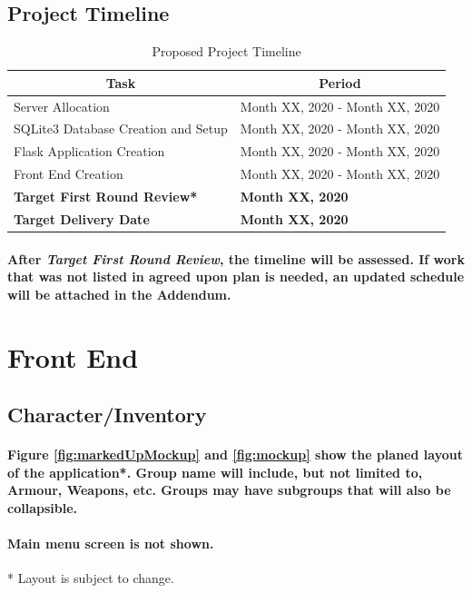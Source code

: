 \documentclass[12pt,letterpaper]{article}
\begin{document}
		\subsection{Project Timeline}
			\begin{table}[hbt]
				\begin{tabular}{|l|l|}
					\hline
					\multicolumn{1}{|c|}{Task} & \multicolumn{1}{|c|}{Period} \\ \hline
					Server Allocation & Month XX, 2020 - Month XX, 2020 \\ \hline
					SQLite3 Database Creation and Setup & Month XX, 2020 - Month XX, 2020 \\ \hline
					Flask Application Creation & Month XX, 2020 - Month XX, 2020 \\ \hline
					Front End Creation & Month XX, 2020 - Month XX, 2020 \\ \hline
					\bf{Target First Round Review*} & \bf{Month XX, 2020} \\ \hline
					\bf{Target Delivery Date} & \bf{Month XX, 2020} \\ \hline
				\end{tabular}
				\caption{Proposed Project Timeline}
				\label{tab:tableProjectTimeline}
			\end{table}
			\paragraph{\indent *After \emph{Target First Round Review}, the timeline will be assessed. If work that was not listed in agreed upon plan is needed, an updated schedule will be attached in the Addendum.\\}
	\section{Front End}
		\subsection{Character/Inventory}
		\paragraph{\indent Figure \ref{fig:markedUpMockup} and \ref{fig:mockup} show the planed layout of the application*. Group name will include, but not limited to, Armour, Weapons, etc. Groups may have subgroups that will also be collapsible. }
		\paragraph{\indent Main menu screen is not shown.}
		* Layout is subject to change.
\end{document}
